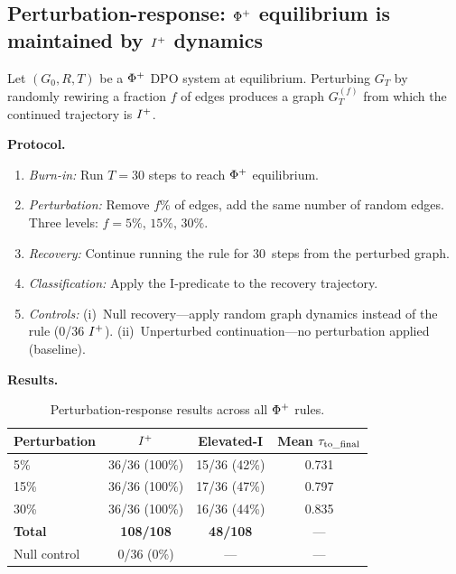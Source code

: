 \documentclass{../shared/primo}
\begin{document}
\subsection{Perturbation-response: $\Phi\textsuperscript{+}$ equilibrium is maintained by $I\textsuperscript{+}$ dynamics}

\begin{proposition}[Computational]\label{prop:perturbation}
Let $(G_0, R, T)$ be a $\Phi\textsuperscript{+}$ DPO system at equilibrium. Perturbing $G_T$ by randomly rewiring a fraction $f$ of edges produces a graph $G_T^{(f)}$ from which the continued trajectory is $I\textsuperscript{+}$.
\end{proposition}

\textbf{Protocol.}
\begin{enumerate}
\item \emph{Burn-in:} Run $T = 30$ steps to reach $\Phi\textsuperscript{+}$ equilibrium.
\item \emph{Perturbation:} Remove $f\%$ of edges, add the same number of random edges. Three levels: $f = 5\%$, $15\%$, $30\%$.
\item \emph{Recovery:} Continue running the rule for 30~steps from the perturbed graph.
\item \emph{Classification:} Apply the I-predicate to the recovery trajectory.
\item \emph{Controls:} (i)~Null recovery---apply random graph dynamics instead of the rule (0/36 $I\textsuperscript{+}$). (ii)~Unperturbed continuation---no perturbation applied (baseline).
\end{enumerate}

\textbf{Results.}

\begin{table}[ht]
\centering
\begin{tabular}{lccc}
\toprule
Perturbation & $I\textsuperscript{+}$ & Elevated-I & Mean $\tau_{\mathrm{to\_final}}$ \\
\midrule
5\% & 36/36 (100\%) & 15/36 (42\%) & 0.731 \\
15\% & 36/36 (100\%) & 17/36 (47\%) & 0.797 \\
30\% & 36/36 (100\%) & 16/36 (44\%) & 0.835 \\
\textbf{Total} & \textbf{108/108} & \textbf{48/108} & --- \\
Null control & 0/36 (0\%) & --- & --- \\
\bottomrule
\end{tabular}
\caption{Perturbation-response results across all $\Phi\textsuperscript{+}$ rules.}
\label{tab:perturbation}
\end{table}
\end{document}
